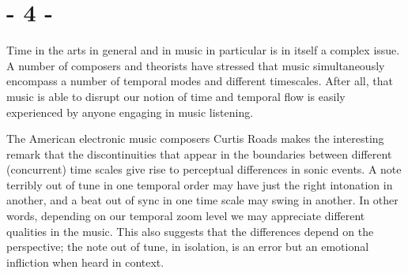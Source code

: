 \documentclass{article}
\begin{document}




\section*{- 4 -}
\label{sec:-4-}

Time in the arts in general and in music in particular is in itself a complex issue.
A number of composers and theorists have stressed that music simultaneously encompass a number of temporal modes and different timescales. After all, that music is able to disrupt our notion of time and temporal flow is easily experienced by anyone engaging in music listening. %

The American electronic music composers Curtis Roads makes the interesting remark that the discontinuities that appear in the boundaries between different (concurrent) time scales give rise to perceptual differences in sonic events. \citep[4]{roads}  A note terribly out of tune in one temporal order may have just the right intonation in another, and a beat out of sync in one time scale may swing in another. \citep[For an example of the great variation in rhythmic timing among jazz musicians when observed at high temporal resolution, see][]{friberg02} In other words, depending on our temporal zoom level we may appreciate different qualities in the music. This also suggests that the differences depend on the perspective; the note out of tune, in isolation, is an error but an emotional infliction when heard in context. 
\end{document}
